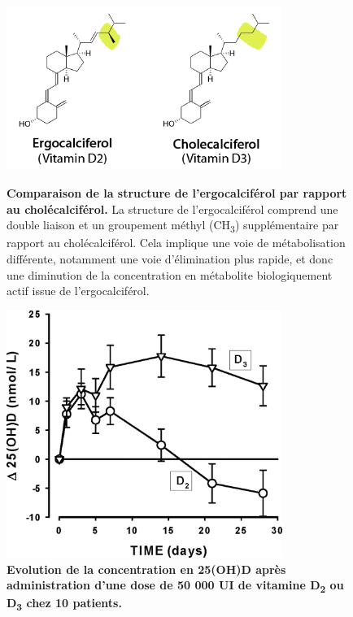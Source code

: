 \documentclass[
  a4paper,
  DIV=11,
  numbers=noendperiod,
  listof=totoc]{scrreprt}
\begin{document}
\begin{figure}[ht]
\centering
\includegraphics[width=0.8\textwidth]{figures/ergo_vs_chole.png}
\caption[Comparaison de la structure de l'ergocalciférol par rapport au cholécalciférol.]{\textbf{Comparaison de la structure de l'ergocalciférol par rapport au cholécalciférol.} La structure de l'ergocalciférol comprend une double liaison et un groupement méthyl (CH\textsubscript{3}) supplémentaire par rapport au cholécalciférol. Cela implique une voie de métabolisation différente, notamment une voie d'élimination plus rapide, et donc une diminution de la concentration en métabolite biologiquement actif issue de l'ergocalciférol. \textcite{Houghton.2006}}
\label{fig:ergo-struc}

\vspace{1em}

\includegraphics[width=0.8\textwidth]{figures/PK_D2_vs_D3.jpeg}
\caption[Evolution de la concentration en 25(OH)D après administration d'une dose de 50 000 UI de vitamine D\textsubscript{2} ou D\textsubscript{3} chez 10 patients.]{\textbf{Evolution de la concentration en 25(OH)D après administration d'une dose de 50 000 UI de vitamine D\textsubscript{2} ou D\textsubscript{3} chez 10 patients.} \textcite{Armas.2004}}
\label{fig:PK}
\end{figure}
\end{document}
